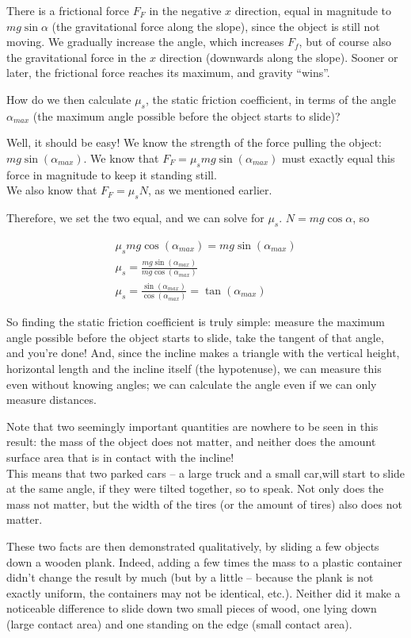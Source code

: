 \documentclass[8.01x]{subfiles}
\begin{document}
There is a frictional force $F_F$ in the negative $x$ direction, equal in magnitude to $m g \sin \alpha$ (the gravitational force along the slope), since the object is still not moving. We gradually increase the angle, which increases $F_f$, but of course also the gravitational force in the $x$ direction (downwards along the slope). Sooner or later, the frictional force reaches its maximum, and gravity ``wins''.

How do we then calculate $\mu_s$, the static friction coefficient, in terms of the angle $\alpha_{max}$ (the maximum angle possible before the object starts to slide)?

Well, it should be easy! We know the strength of the force pulling the object: $m g \sin (\alpha_{max})$. We know that $F_F = \mu_s m g \sin (\alpha_{max})$ must exactly equal this force in magnitude to keep it standing still.\\
We also know that $F_F = \mu_s N$, as we mentioned earlier.

Therefore, we set the two equal, and we can solve for $\mu_s$. $N = m g \cos \alpha$, so

\begin{align}
\mu_s m g \cos (\alpha_{max}) = m g \sin(\alpha_{max})\\
\mu_s = \frac{m g \sin(\alpha_{max})}{m g \cos (\alpha_{max})}\\
\mu_s = \frac{\sin(\alpha_{max})}{\cos (\alpha_{max})} = \tan(\alpha_{max})
\end{align}

So finding the static friction coefficient is truly simple: measure the maximum angle possible before the object starts to slide, take the tangent of that angle, and you're done! And, since the incline makes a triangle with the vertical height, horizontal length and the incline itself (the hypotenuse), we can measure this even without knowing angles; we can calculate the angle even if we can only measure distances.

Note that two seemingly important quantities are nowhere to be seen in this result: the mass of the object does not matter, and neither does the amount surface area that is in contact with the incline!\\
This means that two parked cars -- a large truck and a small car,will start to slide at the same angle, if they were tilted together, so to speak. Not only does the mass not matter, but the width of the tires (or the amount of tires) also does not matter.

These two facts are then demonstrated qualitatively, by sliding a few objects down a wooden plank. Indeed, adding a few times the mass to a plastic container didn't change the result by much (but by a little -- because the plank is not exactly uniform, the containers may not be identical, etc.). Neither did it make a noticeable difference to slide down two small pieces of wood, one lying down (large contact area) and one standing on the edge (small contact area).
\end{document}

